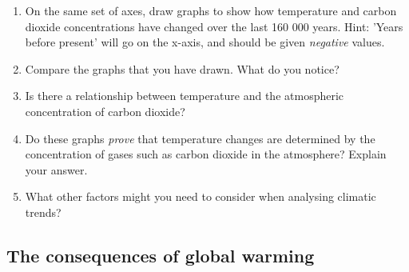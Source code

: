 {\begin{enumerate}
\item{On the same set of axes, draw graphs to show how temperature and carbon dioxide concentrations have changed over the last 160 000 years. Hint: 'Years before present' will go on the x-axis, and should be given \textit{negative} values.}
\item{Compare the graphs that you have drawn. What do you notice?}
\item{Is there a relationship between temperature and the atmospheric concentration of carbon dioxide?}
\item{Do these graphs \textit{prove} that temperature changes are determined by the concentration of gases such as carbon dioxide in the atmosphere? Explain your answer.}
\item{What other factors might you need to consider when analysing climatic trends?}
\end{enumerate}
}

\subsection{The consequences of global warming}

